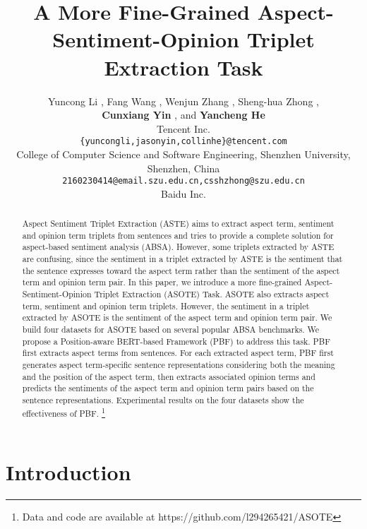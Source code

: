 \documentclass[11pt]{article}
\title{A More Fine-Grained Aspect-Sentiment-Opinion Triplet Extraction Task}
\author{
	Yuncong Li \renewcommand{\thefootnote}{\arabic{footnote}}\footnotemark[1], Fang Wang \renewcommand{\thefootnote}{\arabic{footnote}}\footnotemark[2],  
	Wenjun Zhang \renewcommand{\thefootnote}{\arabic{footnote}}\footnotemark[3], 
	Sheng-hua Zhong \renewcommand{\thefootnote}{\arabic{footnote}}\footnotemark[2] \renewcommand{\thefootnote}{\fnsymbol{footnote}}\footnotemark[2], \\ 
	\textbf{Cunxiang Yin} \renewcommand{\thefootnote}{\arabic{footnote}}\footnotemark[1], and \textbf{Yancheng He} \renewcommand{\thefootnote}{\arabic{footnote}}\footnotemark[1] \\
	
	\renewcommand{\thefootnote}{\arabic{footnote}}\footnotemark[1] Tencent Inc. \\
	\texttt{\{yuncongli,jasonyin,collinhe\}@tencent.com} \\
	\renewcommand{\thefootnote}{\arabic{footnote}}\footnotemark[2] College of Computer Science and Software Engineering, Shenzhen University, \\ Shenzhen, China \\
	\texttt{2160230414@email.szu.edu.cn,csshzhong@szu.edu.cn} \\
	\renewcommand{\thefootnote}{\arabic{footnote}}\footnotemark[3] Baidu Inc.\\
}
\renewcommand{\thefootnote}{\arabic{footnote}}\footnotemark[1] Tencent Inc. \\
\renewcommand{\thefootnote}{\arabic{footnote}}\footnotemark[2] College of Computer Science and Software Engineering, Shenzhen University, \\ Shenzhen, China \\
\renewcommand{\thefootnote}{\arabic{footnote}}\footnotemark[3] Baidu Inc.\\
\begin{document}
\maketitle

\renewcommand{\thefootnote}{\fnsymbol{footnote}}
\renewcommand{\thefootnote}{\arabic{footnote}}

\begin{abstract}
Aspect Sentiment Triplet Extraction (ASTE) aims to extract aspect term, sentiment and opinion term triplets from sentences and tries to provide a complete solution for aspect-based sentiment analysis (ABSA). However, some triplets extracted by ASTE are confusing, since the sentiment in a triplet extracted by ASTE is the sentiment that the sentence expresses toward the aspect term rather than the sentiment of the aspect term and opinion term pair. In this paper, we introduce a more fine-grained Aspect-Sentiment-Opinion Triplet Extraction (ASOTE) Task. ASOTE also extracts aspect term, sentiment and opinion term triplets. However, the sentiment in a triplet extracted by ASOTE is the sentiment of the aspect term and opinion term pair. We build four datasets for ASOTE based on several popular ABSA benchmarks. We propose a Position-aware BERT-based Framework (PBF) to address this task. PBF first extracts aspect terms from sentences. For each extracted aspect term, PBF first generates aspect term-specific sentence representations considering both the meaning and the position of the aspect term, then extracts associated opinion terms and predicts the sentiments of the aspect term and opinion term pairs based on the sentence representations. Experimental results on the four datasets show the effectiveness of PBF. \footnote{Data and code are available at https://github.com/l294265421/ASOTE}
\end{abstract}

\section{Introduction}
\label{sec:introduction}
\end{document}

